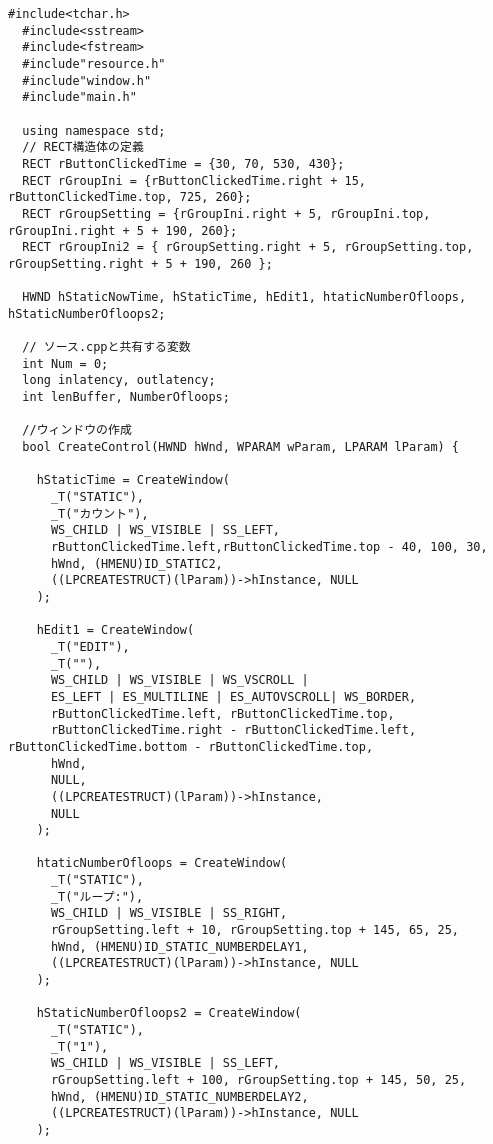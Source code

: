 \begin{lstlisting}[caption=window.cpp]
  #include<tchar.h>
  #include<sstream>
  #include<fstream>
  #include"resource.h"
  #include"window.h"
  #include"main.h"

  using namespace std;
  // RECT構造体の定義
  RECT rButtonClickedTime = {30, 70, 530, 430};
  RECT rGroupIni = {rButtonClickedTime.right + 15, rButtonClickedTime.top, 725, 260};
  RECT rGroupSetting = {rGroupIni.right + 5, rGroupIni.top, rGroupIni.right + 5 + 190, 260};
  RECT rGroupIni2 = { rGroupSetting.right + 5, rGroupSetting.top, rGroupSetting.right + 5 + 190, 260 };

  HWND hStaticNowTime, hStaticTime, hEdit1, htaticNumberOfloops, hStaticNumberOfloops2;

  // ソース.cppと共有する変数
  int Num = 0;
  long inlatency, outlatency;
  int lenBuffer, NumberOfloops;

  //ウィンドウの作成
  bool CreateControl(HWND hWnd, WPARAM wParam, LPARAM lParam) {

    hStaticTime = CreateWindow(
      _T("STATIC"),
      _T("カウント"),
      WS_CHILD | WS_VISIBLE | SS_LEFT,
      rButtonClickedTime.left,rButtonClickedTime.top - 40, 100, 30,
      hWnd, (HMENU)ID_STATIC2, 
      ((LPCREATESTRUCT)(lParam))->hInstance, NULL
    );

    hEdit1 = CreateWindow(
      _T("EDIT"),
      _T(""),
      WS_CHILD | WS_VISIBLE | WS_VSCROLL |
      ES_LEFT | ES_MULTILINE | ES_AUTOVSCROLL| WS_BORDER,
      rButtonClickedTime.left, rButtonClickedTime.top, 
      rButtonClickedTime.right - rButtonClickedTime.left, rButtonClickedTime.bottom - rButtonClickedTime.top,
      hWnd,
      NULL,
      ((LPCREATESTRUCT)(lParam))->hInstance,
      NULL
    );

    htaticNumberOfloops = CreateWindow(
      _T("STATIC"),
      _T("ループ:"),
      WS_CHILD | WS_VISIBLE | SS_RIGHT,
      rGroupSetting.left + 10, rGroupSetting.top + 145, 65, 25,
      hWnd, (HMENU)ID_STATIC_NUMBERDELAY1,
      ((LPCREATESTRUCT)(lParam))->hInstance, NULL
    );

    hStaticNumberOfloops2 = CreateWindow(
      _T("STATIC"),
      _T("1"),
      WS_CHILD | WS_VISIBLE | SS_LEFT,
      rGroupSetting.left + 100, rGroupSetting.top + 145, 50, 25, 
      hWnd, (HMENU)ID_STATIC_NUMBERDELAY2,
      ((LPCREATESTRUCT)(lParam))->hInstance, NULL
    );


\end{lstlisting}
